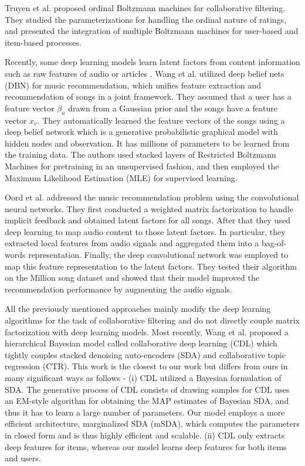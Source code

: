 \documentclass{sig-alternate-05-2015}
\begin{document}
Truyen et al. \cite{phung2009ordinal} proposed ordinal Boltzmann machines for collaborative filtering.
They studied the parameterizations for handling the ordinal nature of ratings,
and presented the integration of multiple Boltzmann machines for user-based and item-based processes.

Recently, some deep learning models learn latent factors from content information
such as raw features of audio or articles \cite{hu2014deep, ouyang2014autoencoder}.
Wang et al. \cite{wang2014improving} utilized deep belief nets (DBN) for music recommendation,
which unifies feature extraction and recommendation of songs in a joint framework.
They assumed that a user has a feature vector $\beta_u$ drawn from a Gaussian prior
and the songs have a feature vector $x_v$.
They automatically learned the feature vectors of the songs using a deep belief network
which is a generative probabilistic graphical model with hidden nodes and observation.
It has millions of parameters to be learned from the training data.
The authors used stacked layers of Restricted Boltzmann Machines
for pretraining in an unsupervised fashion, and then employed
the Maximum Likelihood Estimation (MLE) for supervised learning.

Oord et al. \cite{van2013deep} addressed the music recommendation problem
using the convolutional neural networks.
They first conducted a weighted matrix factorization to handle implicit feedback
and obtained latent factors for all songs.
After that they used deep learning to map audio content to those latent factors.
In particular, they extracted local features from audio signals and
aggregated them into a bag-of-words representation.
Finally, the deep convolutional network was employed to map this feature representation
to the latent factors.
They tested their algorithm on the Million song dataset and
showed that their model improved the recommendation performance by augmenting the audio signals.

All the previously mentioned approaches mainly modify the deep learning algorithms
for the task of collaborative filtering and
do not directly couple matrix factorization with deep learning models.
Most recently, Wang et al. \cite{wang2015collaborative} proposed a hierarchical Bayesian model
called collaborative deep learning (CDL) which tightly couples
stacked denoising auto-encoders (SDA) and collaborative topic regression (CTR).
This work is the closest to our work but differs from ours in many significant ways as follows -
(i) CDL utilized a Bayesian formulation of SDA.
The generative process of CDL consists of drawing samples for CDL uses an EM-style algorithm
for obtaining the MAP estimates of Bayesian SDA,
and thus it has to learn a large number of parameters.
Our model employs a more efficient architecture, marginalized SDA (mSDA),
which computes the parameters in closed form and is thus highly efficient and scalable.
(ii) CDL only extracts deep features for items,
whereas our model learns deep features for both items and users.
\end{document}
